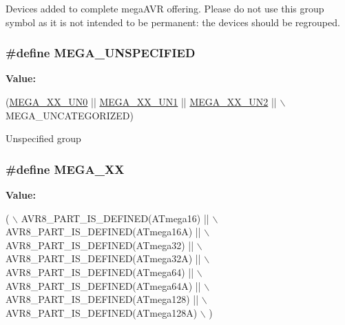 Devices added to complete mega\-A\-V\-R offering. Please do not use this group symbol as it is not intended to be permanent\-: the devices should be regrouped. \hypertarget{group__mega__part__macros__group_gaabb3078f36ad4d875915bd54fa46f337}{
\subsubsection[{M\-E\-G\-A\-\_\-\-U\-N\-S\-P\-E\-C\-I\-F\-I\-E\-D}]{\setlength{\rightskip}{0pt plus 5cm}\#define M\-E\-G\-A\-\_\-\-U\-N\-S\-P\-E\-C\-I\-F\-I\-E\-D}}\label{group__mega__part__macros__group_gaabb3078f36ad4d875915bd54fa46f337}
{\bfseries Value\-:}
\begin{DoxyCode}
(\hyperlink{group__mega__part__macros__group_gae1703e1537f2cbb10b4a8992c8b7b70b}{MEGA\_XX\_UN0} || \hyperlink{group__mega__part__macros__group_gaad35e34280ef078dec0cc18c3ea6d3f6}{MEGA\_XX\_UN1} || \hyperlink{group__mega__part__macros__group_ga5f4566d4ddaa3cee92d4c78162594f2d}{MEGA\_XX\_UN2} || \(\backslash\)
    MEGA\_UNCATEGORIZED)
\end{DoxyCode}
Unspecified group \hypertarget{group__mega__part__macros__group_gabdf992a84b61d19055315a473c2e0f20}{
\subsubsection[{M\-E\-G\-A\-\_\-\-X\-X}]{\setlength{\rightskip}{0pt plus 5cm}\#define M\-E\-G\-A\-\_\-\-X\-X}}\label{group__mega__part__macros__group_gabdf992a84b61d19055315a473c2e0f20}
{\bfseries Value\-:}
\begin{DoxyCode}
( \(\backslash\)
        AVR8\_PART\_IS\_DEFINED(ATmega16)   || \(\backslash\)
        AVR8\_PART\_IS\_DEFINED(ATmega16A)  || \(\backslash\)
        AVR8\_PART\_IS\_DEFINED(ATmega32)   || \(\backslash\)
        AVR8\_PART\_IS\_DEFINED(ATmega32A)  || \(\backslash\)
        AVR8\_PART\_IS\_DEFINED(ATmega64)   || \(\backslash\)
        AVR8\_PART\_IS\_DEFINED(ATmega64A)  || \(\backslash\)
        AVR8\_PART\_IS\_DEFINED(ATmega128)  || \(\backslash\)
        AVR8\_PART\_IS\_DEFINED(ATmega128A) \(\backslash\)
        )
\end{DoxyCode}
